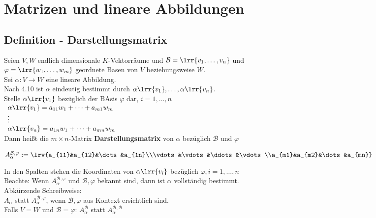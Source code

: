 \newpage
\section{Matrizen und lineare Abbildungen}
\subsection{Definition - Darstellungsmatrix}
	Seien $V,W$ endlich dimensionale $K$-Vektorräume und $\mathcal{B}=\lrr{v_1,\dots,v_n}$ und\\
	$\varphi=\lrr{w_1,\dots,w_m}$ geordnete Basen von $V$ beziehungsweise $W$.\\
	Sei $\alpha: V\rightarrow W$ eine lineare Abbildung.\\
	Nach 4.10 ist $\alpha$ eindeutig bestimmt durch $\alpha\lrr{v_1},\dots,\alpha\lrr{v_n}$.\\
	Stelle $\alpha\lrr{v_1}$ bezüglich der BAsis $\varphi$ dar, $i=1,\dots,n$\\
	$\begin{array}{l}
		\alpha\lrr{v_1}=a_{11}w_1+\dots+a_{m1}w_m\\
		\vdots\\
		\alpha\lrr{v_n}=a_{1n}w_1+\dots+a_{mn}w_m
	\end{array}$\\
	Dann heißt die $m\times n$-Matrix \textbf{Darstellungsmatrix} von $\alpha$ bezüglich $\mathcal{B}$ und $\varphi$

	$A_{\alpha}^{\mathcal{B}, \varphi}:=\lrv{a_{11}&a_{12}&\dots&a_{1n}\\\vdots&\vdots&\ddots&\vdots\\a_{m1}&a_{m2}&\dots&a_{mn}}$

	In den Spalten stehen die Koordinaten von $\alpha\lrr{v_i}$ bezüglich $\varphi, i=1,\dots,n$\\
	Beachte: Wenn $A_{\alpha}^{\mathcal{B}, \varphi}$ und $\mathcal{B},\varphi$ bekannt sind, dann ist $\alpha$ vollständig bestimmt.\\
	Abkürzende Schreibweise:\\
	$A_\alpha$ statt $A_{\alpha}^{\mathcal{B}, \varphi}$, wenn $\mathcal{B},\varphi$ aus Kontext ersichtlich sind.\\
	Falls $V=W$ und $\mathcal{B}=\varphi$: $A_{\alpha}^{\mathcal{B}}$ statt $A_{\alpha}^{\mathcal{B}, \mathcal{B}}$


